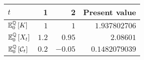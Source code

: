 \documentclass[main.tex]{subfiles}
\begin{document}
        \begin{table}[H]
            \centering
            \begin{tabular}{l|rr||r}
                $t$ & 1 & 2 & Present value \\
                \hline
                \rule{0pt}{1.1em}
                $\mathbb{E}_{0}^{\mathbb{Q}}\left[K\right]$ & $\num{1}$ & $\num{1}$ & $\num{1.937802706}$ \\
                \rule{0pt}{1.1em}
                $\mathbb{E}_{0}^{\mathbb{Q}}\left[X_t\right]$ & $\num{1.2}$ & $\num{0.95}$ & $\num{2.08601}$ \\
                \rule{0pt}{1.1em}
                $\mathbb{E}_{0}^{\mathbb{Q}}\left[\mathcal{C}_t\right]$ & $\num{0.2}$ & $\num{-0.05}$ & $\num{0.1482079039}$ \\
            \end{tabular}
            \caption{}
            \label{tbl:swap-legs}
        \end{table}
\end{document}
